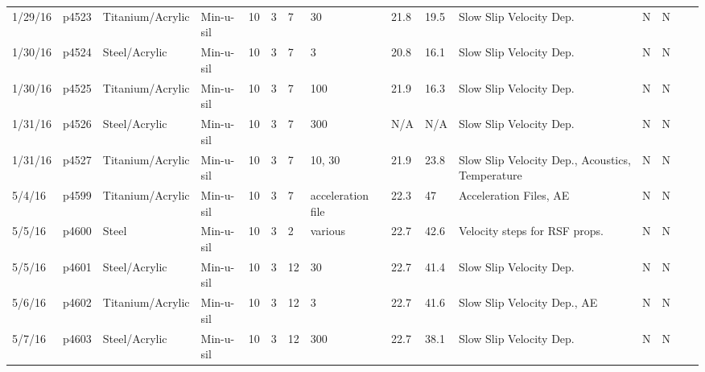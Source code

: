 \begin{landscape}
\begin{longtable}{lllllllllllllll}
1/29/16  & p4523      & Titanium/Acrylic & Min-u-sil    & 10           & 3         & 7             & 30                           & 21.8        & 19.5     & Slow Slip Velocity Dep.                         & N     & N    &  &  \\
1/30/16  & p4524      & Steel/Acrylic    & Min-u-sil    & 10           & 3         & 7             & 3                            & 20.8        & 16.1     & Slow Slip Velocity Dep.                         & N     & N    &  &  \\
1/30/16  & p4525      & Titanium/Acrylic & Min-u-sil    & 10           & 3         & 7             & 100                          & 21.9        & 16.3     & Slow Slip Velocity Dep.                         & N     & N    &  &  \\
1/31/16  & p4526      & Steel/Acrylic    & Min-u-sil    & 10           & 3         & 7             & 300                          & N/A         & N/A      & Slow Slip Velocity Dep.                         & N     & N    &  &  \\
1/31/16  & p4527      & Titanium/Acrylic & Min-u-sil    & 10           & 3         & 7             & 10, 30                       & 21.9        & 23.8     & Slow Slip Velocity Dep., Acoustics, Temperature & N     & N    &  &  \\
5/4/16   & p4599      & Titanium/Acrylic & Min-u-sil    & 10           & 3         & 7             & acceleration file            & 22.3        & 47       & Acceleration Files, AE                          & N     & N    &  &  \\
5/5/16   & p4600      & Steel            & Min-u-sil    & 10           & 3         & 2             & various                      & 22.7        & 42.6     & Velocity steps for RSF props.                   & N     & N    &  &  \\
5/5/16   & p4601      & Steel/Acrylic    & Min-u-sil    & 10           & 3         & 12            & 30                           & 22.7        & 41.4     & Slow Slip Velocity Dep.                         & N     & N    &  &  \\
5/6/16   & p4602      & Titanium/Acrylic & Min-u-sil    & 10           & 3         & 12            & 3                            & 22.7        & 41.6     & Slow Slip Velocity Dep., AE                     & N     & N    &  &  \\
5/7/16   & p4603      & Steel/Acrylic    & Min-u-sil    & 10           & 3         & 12            & 300                          & 22.7        & 38.1     & Slow Slip Velocity Dep.                         & N     & N    &  &  \\

\end{longtable}
\end{landscape}
